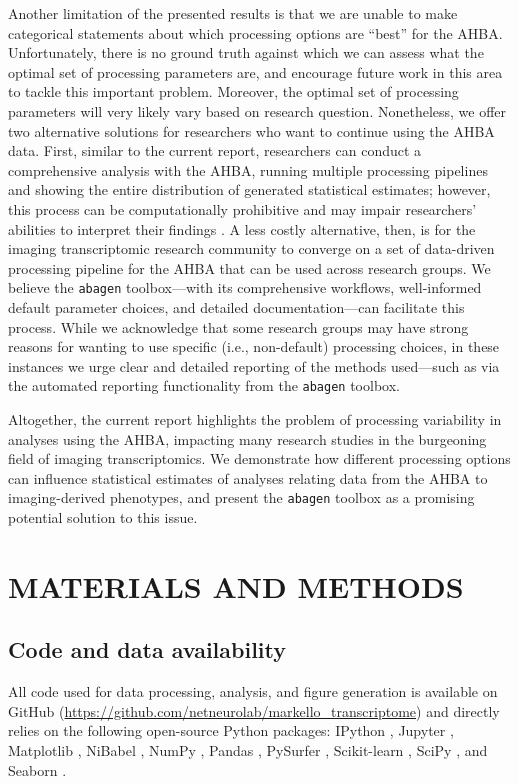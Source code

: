 \documentclass[12pt,aps,pra,reprint,showkeys]{revtex4-1}
\begin{document}
Another limitation of the presented results is that we are unable to make categorical statements about which processing options are ``best'' for the AHBA.
Unfortunately, there is no ground truth against which we can assess what the optimal set of processing parameters are, and encourage future work in this area to tackle this important problem.
Moreover, the optimal set of processing parameters will very likely vary based on research question.
Nonetheless, we offer two alternative solutions for researchers who want to continue using the AHBA data.
First, similar to the current report, researchers can conduct a comprehensive analysis with the AHBA, running multiple processing pipelines and showing the entire distribution of generated statistical estimates; however, this process can be computationally prohibitive and may impair researchers' abilities to interpret their findings \citep{steegen2016psp}.
A less costly alternative, then, is for the imaging transcriptomic research community to converge on a set of data-driven processing pipeline for the AHBA that can be used across research groups.
We believe the \texttt{abagen} toolbox---with its comprehensive workflows, well-informed default parameter choices, and detailed documentation---can facilitate this process.
While we acknowledge that some research groups may have strong reasons for wanting to use specific (i.e., non-default) processing choices, in these instances we urge clear and detailed reporting of the methods used---such as via the automated reporting functionality from the \texttt{abagen} toolbox.

Altogether, the current report highlights the problem of processing variability in analyses using the AHBA, impacting many research studies in the burgeoning field of imaging transcriptomics.
We demonstrate how different processing options can influence statistical estimates of analyses relating data from the AHBA to imaging-derived phenotypes, and present the \texttt{abagen} toolbox as a promising potential solution to this issue.

\section*{MATERIALS AND METHODS}

\subsection*{Code and data availability}

All code used for data processing, analysis, and figure generation is available on GitHub (\url{https://github.com/netneurolab/markello_transcriptome}) and directly relies on the following open-source Python packages: IPython \citep{ipython}, Jupyter \citep{jupyter}, Matplotlib \citep{matplotlib}, NiBabel \citep{nibabel}, NumPy \citep{numpyv1, numpyv2, numpyv3}, Pandas \citep{pandas}, PySurfer \citep{pysurfer}, Scikit-learn \citep{sklearn}, SciPy \citep{scipy}, and Seaborn \citep{seaborn}.
\end{document}
